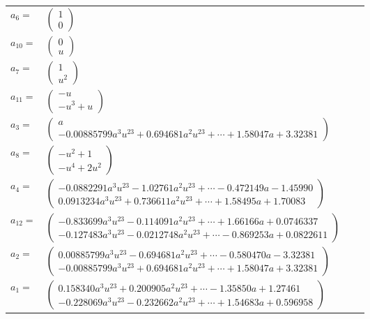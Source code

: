 \documentclass[1p]{elsarticle_modified}
\theoremstyle{definition}
\begin{document}
\begin{tabular}{m{7pt} m{180pt} m{7pt} m{180pt} }
\flushright $a_{6}=$&$\begin{pmatrix}1\\0\end{pmatrix}$ \\
\flushright $a_{10}=$&$\begin{pmatrix}0\\u\end{pmatrix}$ \\
\flushright $a_{7}=$&$\begin{pmatrix}1\\u^2\end{pmatrix}$ \\
\flushright $a_{11}=$&$\begin{pmatrix}- u\\- u^3+u\end{pmatrix}$ \\
\flushright $a_{3}=$&$\begin{pmatrix}a\\-0.00885799 a^{3} u^{23}+0.694681 a^{2} u^{23}+\cdots+1.58047 a+3.32381\end{pmatrix}$ \\
\flushright $a_{8}=$&$\begin{pmatrix}- u^2+1\\- u^4+2 u^2\end{pmatrix}$ \\
\flushright $a_{4}=$&$\begin{pmatrix}-0.0882291 a^{3} u^{23}-1.02761 a^{2} u^{23}+\cdots-0.472149 a-1.45990\\0.0913234 a^{3} u^{23}+0.736611 a^{2} u^{23}+\cdots+1.58495 a+1.70083\end{pmatrix}$ \\
\flushright $a_{12}=$&$\begin{pmatrix}-0.833699 a^{3} u^{23}-0.114091 a^{2} u^{23}+\cdots+1.66166 a+0.0746337\\-0.127483 a^{3} u^{23}-0.0212748 a^{2} u^{23}+\cdots-0.869253 a+0.0822611\end{pmatrix}$ \\
\flushright $a_{2}=$&$\begin{pmatrix}0.00885799 a^{3} u^{23}-0.694681 a^{2} u^{23}+\cdots-0.580470 a-3.32381\\-0.00885799 a^{3} u^{23}+0.694681 a^{2} u^{23}+\cdots+1.58047 a+3.32381\end{pmatrix}$ \\
\flushright $a_{1}=$&$\begin{pmatrix}0.158340 a^{3} u^{23}+0.200905 a^{2} u^{23}+\cdots-1.35850 a+1.27461\\-0.228069 a^{3} u^{23}-0.232662 a^{2} u^{23}+\cdots+1.54683 a+0.596958\end{pmatrix}$ \\

\end{tabular}
\end{document}
